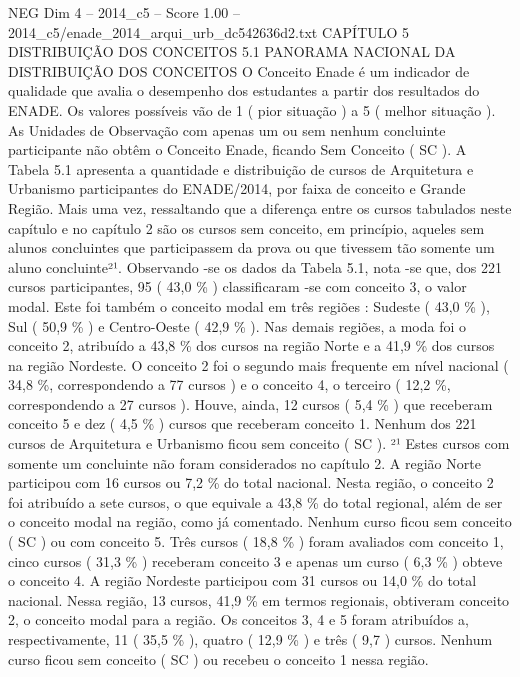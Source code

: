 \begin{textsample}{NEG Dim 4 – 2014\_c5 – Score 1.00 – 2014\_c5/enade\_2014\_arqui\_urb\_dc542636d2.txt}  \label{ex:f4_neg_203}
CAPÍTULO 5 DISTRIBUIÇÃO DOS CONCEITOS 5.1 PANORAMA NACIONAL DA DISTRIBUIÇÃO DOS CONCEITOS O Conceito Enade é um indicador de qualidade que avalia o desempenho dos estudantes a partir dos resultados do ENADE.
Os valores possíveis vão de 1 ( pior situação ) a 5 ( melhor situação ).
As Unidades de Observação com apenas um ou sem nenhum concluinte participante não obtêm o Conceito Enade, ficando Sem Conceito ( SC ).
A Tabela 5.1 apresenta a quantidade e distribuição de cursos de Arquitetura e Urbanismo participantes do ENADE/2014, por faixa de conceito e Grande Região.
Mais uma vez, ressaltando que a diferença entre os cursos tabulados neste capítulo e no capítulo 2 são os cursos sem conceito, em princípio, aqueles sem alunos concluintes que participassem da prova ou que tivessem tão somente um aluno concluinte²¹.
Observando -se os dados da Tabela 5.1, nota -se que, dos 221 cursos participantes, 95 ( 43,0 \% ) classificaram -se com conceito 3, o valor modal.
Este foi também o conceito modal em três regiões : Sudeste ( 43,0 \% ), Sul ( 50,9 \% ) e Centro-Oeste ( 42,9 \% ).
Nas demais regiões, a moda foi o conceito 2, atribuído a 43,8 \% dos cursos na região Norte e a 41,9 \% dos cursos na região Nordeste.
O conceito 2 foi o segundo mais frequente em nível nacional ( 34,8 \%, correspondendo a 77 cursos ) e o conceito 4, o terceiro ( 12,2 \%, correspondendo a 27 cursos ).
Houve, ainda, 12 cursos ( 5,4 \% ) que receberam conceito 5 e dez ( 4,5 \% ) cursos que receberam conceito 1.
Nenhum dos 221 cursos de Arquitetura e Urbanismo ficou sem conceito ( SC ). ²¹ Estes cursos com somente um concluinte não foram considerados no capítulo 2.
A região Norte participou com 16 cursos ou 7,2 \% do total nacional.
Nesta região, o conceito 2 foi atribuído a sete cursos, o que equivale a 43,8 \% do total regional, além de ser o conceito modal na região, como já comentado.
Nenhum curso ficou sem conceito ( SC ) ou com conceito 5.
Três cursos ( 18,8 \% ) foram avaliados com conceito 1, cinco cursos ( 31,3 \% ) receberam conceito 3 e apenas um curso ( 6,3 \% ) obteve o conceito 4.
A região Nordeste participou com 31 cursos ou 14,0 \% do total nacional.
Nessa região, 13 cursos, 41,9 \% em termos regionais, obtiveram conceito 2, o conceito modal para a região.
Os conceitos 3, 4 e 5 foram atribuídos a, respectivamente, 11 ( 35,5 \% ), quatro ( 12,9 \% ) e três ( 9,7 ) cursos.
Nenhum curso ficou sem conceito ( SC ) ou recebeu o conceito 1 nessa região.

\end{textsample}
